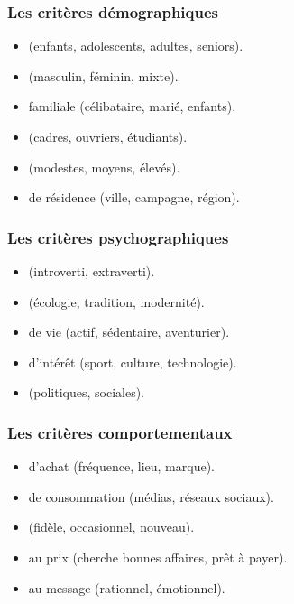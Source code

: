 \subsubsection{Les critères démographiques}

\begin{itemize}
    \item {} (enfants, adolescents, adultes, seniors).
    \item {} (masculin, féminin, mixte).
    \item {} familiale (célibataire, marié, enfants).
    \item {} (cadres, ouvriers, étudiants).
    \item {} (modestes, moyens, élevés).
    \item {} de résidence (ville, campagne, région).
\end{itemize}

\subsubsection{Les critères psychographiques}

\begin{itemize}
    \item {} (introverti, extraverti).
    \item {} (écologie, tradition, modernité).
    \item {} de vie (actif, sédentaire, aventurier).
    \item {} d'intérêt (sport, culture, technologie).
    \item {} (politiques, sociales).
\end{itemize}

\subsubsection{Les critères comportementaux}

\begin{itemize}
    \item {} d'achat (fréquence, lieu, marque).
    \item {} de consommation (médias, réseaux sociaux).
    \item {} (fidèle, occasionnel, nouveau).
    \item {} au prix (cherche bonnes affaires, prêt à payer).
    \item {} au message (rationnel, émotionnel).
\end{itemize}

